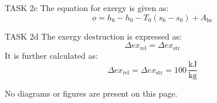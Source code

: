 TASK 2c  
The equation for exergy is given as:  
\[
o = h_6 - h_0 - T_0 (s_6 - s_0) + A_{\text{he}}
\]  

TASK 2d  
The exergy destruction is expressed as:  
\[
\Delta ex_{\text{rel}} = \Delta ex_{\text{str}}
\]  
It is further calculated as:  
\[
\Delta ex_{\text{rel}} = \Delta ex_{\text{str}} = 100 \, \frac{\text{kJ}}{\text{kg}}
\]  

No diagrams or figures are present on this page.